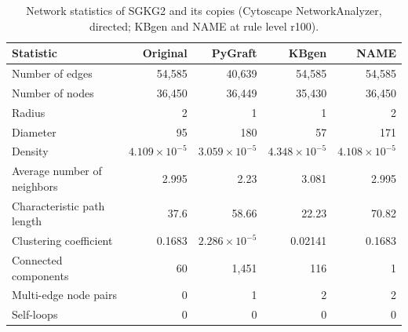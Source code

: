 \begin{table}[t]
\centering
\caption{Network statistics of SGKG2 and its copies (Cytoscape NetworkAnalyzer, directed; KBgen and NAME at rule level r100).}
\label{tab:cytoscape_SGKG2}
\begin{tabular}{lrrrr}
\toprule
Statistic & Original & PyGraft & KBgen & NAME \\
\midrule
Number of edges & 54{,}585 & 40{,}639 & 54{,}585 & 54{,}585 \\
Number of nodes & 36{,}450 & 36{,}449 & 35{,}430 & 36{,}450 \\
Radius & 2 & 1 & 1 & 2 \\
Diameter & 95 & 180 & 57 & 171 \\
Density & $4.109\times10^{-5}$ & $3.059\times10^{-5}$ & $4.348\times10^{-5}$ & $4.108\times10^{-5}$ \\
Average number of neighbors & 2.995 & 2.23 & 3.081 & 2.995 \\
Characteristic path length & 37.6 & 58.66 & 22.23 & 70.82 \\
Clustering coefficient & 0.1683 & $2.286\times10^{-5}$ & 0.02141 & 0.1683 \\
Connected components & 60 & 1{,}451 & 116 & 1 \\
Multi-edge node pairs & 0 & 1 & 2 & 2 \\
Self-loops & 0 & 0 & 0 & 0 \\
\bottomrule
\end{tabular}
\end{table}

